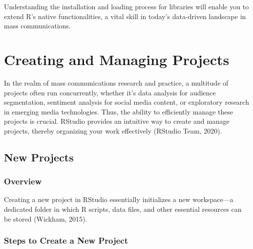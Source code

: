 \documentclass[
]{book}
\begin{document}
Understanding the installation and loading process for libraries will enable you to extend R's native functionalities, a vital skill in today's data-driven landscape in mass communications.

\hypertarget{creating-and-managing-projects}{%
\section{Creating and Managing Projects}\label{creating-and-managing-projects}}

In the realm of mass communications research and practice, a multitude of projects often run concurrently, whether it's data analysis for audience segmentation, sentiment analysis for social media content, or exploratory research in emerging media technologies. Thus, the ability to efficiently manage these projects is crucial. RStudio provides an intuitive way to create and manage projects, thereby organizing your work effectively (RStudio Team, 2020).

\hypertarget{new-projects}{%
\subsection*{New Projects}\label{new-projects}}

\hypertarget{overview-8}{%
\subsubsection*{Overview}\label{overview-8}}

Creating a new project in RStudio essentially initializes a new workspace---a dedicated folder in which R scripts, data files, and other essential resources can be stored (Wickham, 2015).

\hypertarget{steps-to-create-a-new-project}{%
\subsubsection*{Steps to Create a New Project}\label{steps-to-create-a-new-project}}
\end{document}

